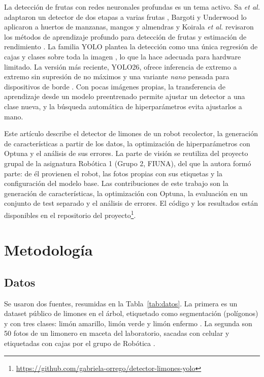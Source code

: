\documentclass[conference]{IEEEtran}
\begin{document}
La detección de frutas con redes neuronales profundas es un tema activo. Sa \textit{et al.} adaptaron un detector de dos etapas a varias frutas \cite{sa2016}, Bargoti y Underwood lo aplicaron a huertos de manzanas, mangos y almendras \cite{bargoti2017} y Koirala \textit{et al.} revisaron los métodos de aprendizaje profundo para detección de frutas y estimación de rendimiento \cite{koirala2019}. La familia YOLO plantea la detección como una única regresión de cajas y clases sobre toda la imagen \cite{redmon2016}, lo que la hace adecuada para hardware limitado. La versión más reciente, YOLO26, ofrece inferencia de extremo a extremo sin supresión de no máximos y una variante \textit{nano} pensada para dispositivos de borde \cite{yolo26}. Con pocas imágenes propias, la transferencia de aprendizaje desde un modelo preentrenado \cite{pan2010} permite ajustar un detector a una clase nueva, y la búsqueda automática de hiperparámetros \cite{bergstra2011,akiba2019} evita ajustarlos a mano.

Este artículo describe el detector de limones de un robot recolector, la generación de características a partir de los datos, la optimización de hiperparámetros con Optuna y el análisis de sus errores. La parte de visión se reutiliza del proyecto grupal de la asignatura Robótica 1 (Grupo 2, FIUNA), del que la autora formó parte: de él provienen el robot, las fotos propias con sus etiquetas y la configuración del modelo base. Las contribuciones de este trabajo son la generación de características, la optimización con Optuna, la evaluación en un conjunto de test separado y el análisis de errores. El código y los resultados están disponibles en el repositorio del proyecto\footnote{\url{https://github.com/gabriela-orrego/detector-limones-yolo}}.

\section{Metodología}
\subsection{Datos}
Se usaron dos fuentes, resumidas en la Tabla~\ref{tab:datos}. La primera es un dataset público de limones en el árbol, etiquetado como segmentación (polígonos) y con tres clases: limón amarillo, limón verde y limón enfermo \cite{brinjal}. La segunda son 50 fotos de un limonero en maceta del laboratorio, sacadas con celular y etiquetadas con cajas por el grupo de Robótica \cite{limones}.
\end{document}
